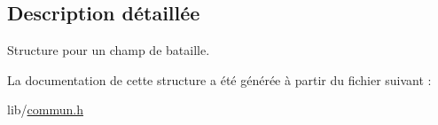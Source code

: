 \subsection{Description détaillée}
Structure pour un champ de bataille. 

La documentation de cette structure a été générée à partir du fichier suivant \+:\begin{DoxyCompactItemize}
\item 
lib/\hyperlink{commun_8h}{commun.\+h}\end{DoxyCompactItemize}
